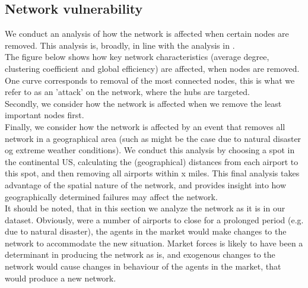 \subsection{Network vulnerability}
We conduct an analysis of how the network is affected when certain nodes are removed. This analysis is, broadly, in line with the analysis in \cite{chi2004structural}. \\
The figure below shows how key network characteristics (average degree, clustering coefficient and global efficiency) are affected, when nodes are removed. One curve corresponds to removal of the most connected nodes, this is what we refer to as an 'attack' on the network, where the hubs are targeted. \\
Secondly, we consider how the network is affected when we remove the least important nodes first. \\
Finally, we consider how the network is affected by an event that removes all network in a geographical area (such as might be the case due to natural disaster og extreme weather conditions). We conduct this analysis by choosing a spot in the continental US, calculating the (geographical) distances from each airport to this spot, and then removing all airports within x miles. This final analysis takes advantage of the spatial nature of the network, and provides insight into how geographically determined failures may affect the network. \\
It should be noted, that in this section we analyze the network as it is in our dataset. Obviously, were a number of airports to close for a prolonged period (e.g. due to natural disaster), the agents in the market would make changes to the network to accommodate the new situation. Market forces is likely to have been a determinant in producing the network as is, and exogenous changes to the network would cause changes in behaviour of the agents in the market, that would produce a new network. \\ 

